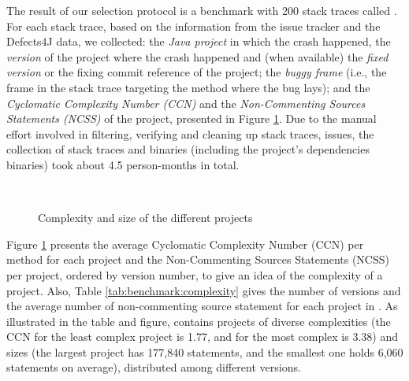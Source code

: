 
The result of our selection protocol is a benchmark with 200 stack traces called \emph{\crashpack}. 
For each stack trace, based on the information from the issue tracker and the Defects4J data, we collected: the \emph{Java project} in which the crash happened, the \emph{version} of the project where the crash happened and (when available) the \emph{fixed version}  or the fixing commit reference of the project; the \emph{buggy frame} (i.e., the frame in the stack trace targeting the method where the bug lays); and the \emph{Cyclomatic Complexity Number (CCN)} and the \emph{Non-Com\-men\-ting Sources Statements (NCSS)} of the project, presented in Figure \ref{fig:ccnncssperapp}. 
Due to the manual effort involved in filtering, verifying and cleaning up stack traces, issues, the collection of stack traces and binaries (including the project's dependencies binaries) took about 4.5 person-months in total.

\begin{figure}[t]
  \centering
  \\
  \caption{Complexity and size of the different projects}
  \label{fig:ccnncssperapp}
\end{figure}

Figure \ref{fig:ccnncssperapp} presents the average Cyclomatic Complexity Number (CCN) per method for each project and the Non-Com\-men\-ting Sources Statements (NCSS) per project, ordered by version number, to give an idea of the complexity of a project. Also, Table \ref{tab:benchmark:complexity} gives the number of versions and the average number of non-commenting source statement for each project in \crashpack.
As illustrated in the table and figure, \crashpack contains projects of diverse complexities (the CCN for the least complex project is 1.77, and for the most complex is 3.38) and sizes (the largest project has 177,840 statements, and the smallest one holds 6,060 statements on average), distributed among different versions.

